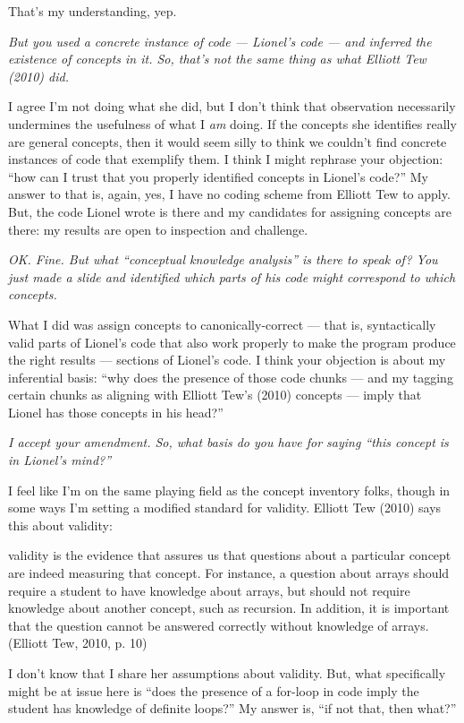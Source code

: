 That's my understanding, yep.

\emph{But you used a concrete instance of code --- Lionel's code --- and
inferred the existence of concepts in it. So, that's not the same thing
as what Elliott Tew (2010) did.}

I agree I'm not doing what she did, but I don't think that observation
necessarily undermines the usefulness of what I \emph{am} doing. If the
concepts she identifies really are general concepts, then it would seem
silly to think we couldn't find concrete instances of code that
exemplify them. I think I might rephrase your objection: ``how can I
trust that you properly identified concepts in Lionel's code?'' My
answer to that is, again, yes, I have no coding scheme from Elliott Tew
to apply. But, the code Lionel wrote is there and my candidates for
assigning concepts are there: my results are open to inspection and
challenge.

\emph{OK. Fine. But what ``conceptual knowledge analysis'' is there to
speak of? You just made a slide and identified which parts of his code
might correspond to which concepts.}

What I did was assign concepts to canonically-correct --- that is,
syntactically valid parts of Lionel's code that also work properly to
make the program produce the right results --- sections of Lionel's
code. I think your objection is about my inferential basis: ``why does
the presence of those code chunks --- and my tagging certain chunks as
aligning with Elliott Tew's (2010) concepts --- imply that Lionel has
those concepts in his head?''

\emph{I accept your amendment. So, what basis do you have for saying
``this concept is in Lionel's mind?''}

I feel like I'm on the same playing field as the concept inventory
folks, though in some ways I'm setting a modified standard for validity.
Elliott Tew (2010) says this about validity:

validity is the evidence that assures us that questions about a
particular concept are indeed measuring that concept. For instance, a
question about arrays should require a student to have knowledge about
arrays, but should not require knowledge about another concept, such as
recursion. In addition, it is important that the question cannot be
answered correctly without knowledge of arrays. (Elliott Tew, 2010, p.
10)

I don't know that I share her assumptions about validity. But, what
specifically might be at issue here is ``does the presence of a for-loop
in code imply the student has knowledge of definite loops?'' My answer
is, ``if not that, then what?''

